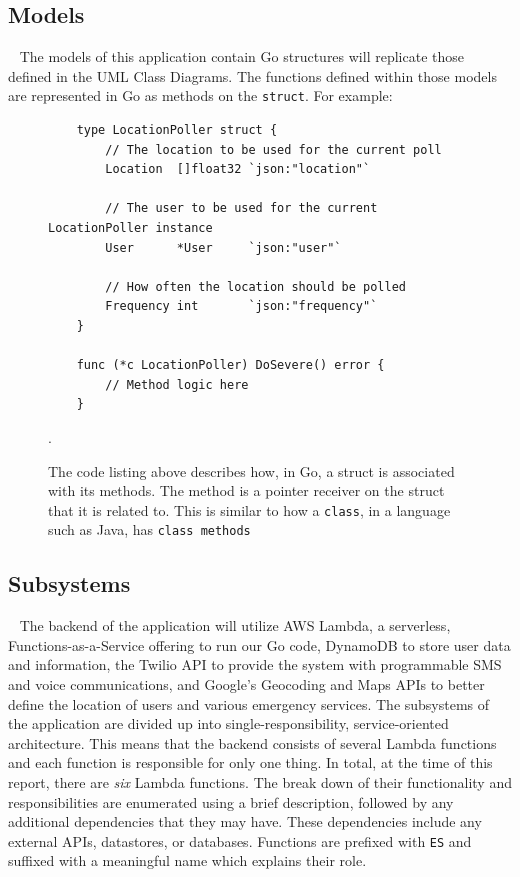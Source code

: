 \documentclass[10pt, a4paper]{article}
\begin{document}
\subsection{Models}
\par ~ The models of this application contain Go structures will replicate those defined in the UML Class Diagrams. The functions defined within those models are represented in Go as methods on the \texttt{struct}. For example:


\begin{figure}[!h]
	\begin{center}
	\begin{lstlisting}
	type LocationPoller struct {
		// The location to be used for the current poll
		Location  []float32 `json:"location"`
		
		// The user to be used for the current LocationPoller instance
		User      *User     `json:"user"`
		
		// How often the location should be polled	
		Frequency int       `json:"frequency"`
	}

	func (*c LocationPoller) DoSevere() error {
		// Method logic here	
	}
	\end{lstlisting}
	\end{center}
\caption{The code listing above describes how, in Go, a struct is associated with its methods. The method is a pointer receiver on the struct that it is related to. This is similar to how a \texttt{class}, in a language such as Java, has \texttt{class methods}}.
\end{figure}

\subsection{Subsystems}
\par ~ The backend of the application will utilize AWS Lambda, a serverless, Functions-as-a-Service offering to run our Go code, DynamoDB to store user data and information, the Twilio API to provide the system with programmable SMS and voice communications, and Google's Geocoding and Maps APIs to better define the location of users and various emergency services. The subsystems of the application are divided up into single-responsibility, service-oriented architecture. This means that the backend consists of several Lambda functions and each function is responsible for only one thing. In total, at the time of this report, there are \emph{six} Lambda functions. The break down of their functionality and responsibilities are enumerated using a brief description, followed by any additional dependencies that they may have. These dependencies include any external APIs, datastores, or databases. Functions are prefixed with \texttt{ES} and suffixed with a meaningful name which explains their role.
\end{document}
